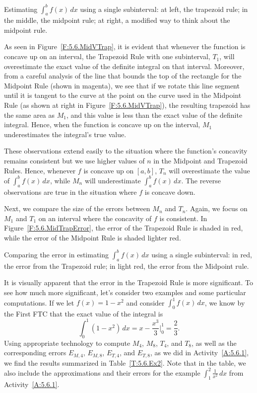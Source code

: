 \begin{marginfigure} %
\caption{Estimating $\int_a^b f(x) \, dx$ using a single subinterval: at left, the trapezoid rule; in the middle, the midpoint rule; at right, a modified way to think about the midpoint rule.} 
\label{F:5.6.MidVTrap}
\end{marginfigure}

As seen in Figure~\ref{F:5.6.MidVTrap}, it is evident that whenever the function is concave up on an interval, the Trapezoid Rule with one subinterval, $T_1$, will overestimate the exact value of the definite integral on that interval.  Moreover, from a careful analysis of the line that bounds the top of the rectangle for the Midpoint Rule (shown in magenta), we see that if we rotate this line segment until it is tangent to the curve at the point on the curve used in the Midpoint Rule (as shown at right in Figure~\ref{F:5.6.MidVTrap}), the resulting trapezoid has the same area as $M_1$, and this value is less than the exact value of the definite integral.  Hence, when the function is concave up on the interval, $M_1$ underestimates the integral's true value.

These observations extend easily to the situation where the function's concavity remains consistent but we use higher values of $n$ in the Midpoint and Trapezoid Rules.  Hence, whenever $f$ is concave up on $[a,b]$, $T_n$ will overestimate the value of $\int_a^b f(x) \, dx$, while $M_n$ will underestimate $\int_a^b f(x) \, dx$.   The reverse observations are true in the situation where $f$ is concave down.

Next, we compare the size of the errors between $M_n$ and $T_n$.  Again, we focus on $M_1$ and $T_1$ on an interval where the concavity of $f$ is consistent.  In Figure~\ref{F:5.6.MidTrapError}, the error of the Trapezoid Rule is shaded in red, while the error of the Midpoint Rule is shaded lighter red.  

\begin{marginfigure} %
\caption{Comparing the error in estimating $\int_a^b f(x) \, dx$ using a single subinterval: in red, the error from the Trapezoid rule; in light red, the error from the Midpoint rule.} 
\label{F:5.6.MidTrapError}
\end{marginfigure}

It is visually apparent that the error in the Trapezoid Rule is more significant.  To see how much more significant, let's consider two examples and some particular computations.  If we let $f(x) = 1-x^2$ and consider $\int_0^1 f(x) \,dx$, we know by the First FTC that the exact value of the integral is
$$\int_0^1 (1-x^2) \, dx = x - \frac{x^3}{3} \bigg\vert_0^1 = \frac{2}{3}.$$
Using appropriate technology to compute $M_4$, $M_8$, $T_4$, and $T_8$, as well as the corresponding errors $E_{M,4}$, $E_{M,8}$, $E_{T,4}$, and $E_{T,8}$, as we did in Activity~\ref{A:5.6.1}, we find the results summarized in Table~\ref{T:5.6.Ex2}.  Note that in the table, we also include the approximations and their errors for the example $\int_1^2 \frac{1}{x^2} \, dx$ from Activity~\ref{A:5.6.1}.

